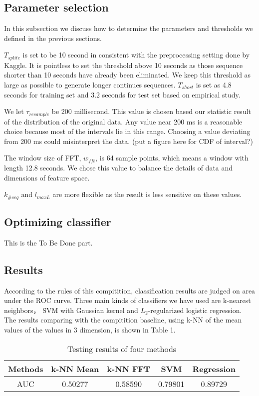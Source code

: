 \documentclass{article} %
\begin{document}
\subsection{Parameter selection}
In this subsection we discuss how to determine the parameters and thresholds we defined in the previous sections.

$T_{splite}$ is set to be 10 second in consistent with the preprocessing setting done by Kaggle. It is pointless to set the threshold above 10 seconds as those sequence shorter than 10 seconds have already been eliminated. We keep this threshold as large as possible to generate longer continues sequences. $T_{short}$ is set as 4.8 seconds for training set and 3.2 seconds for test set based on empirical study. 

We let $\tau_{resample}$ be 200 millisecond. This value is chosen based our statistic result of the distribution of the original data. Any value near 200 ms is a reasonable choice because most of the intervals lie in this range. Choosing a value deviating from 200 ms could misinterpret the data. (put a figure here for CDF of interval?)

The window size of FFT, $w_{fft}$, is 64 sample points, which means a window with length 12.8 seconds. We chose this value to balance the details of data and dimensions of feature space. 

$k_{\#seq}$ and  $l_{maxL}$ are more flexible as the result is less sensitive on these values.

\subsection{Optimizing classifier}
This is the To Be Done part.

\subsection{Results}

According to the rules of this compitition, classification results are judged on area under the ROC curve. Three main kinds of classifiers we have used are k-nearest neighbors， SVM with Gaussian kernel and $L_2$-regularized logistic regression. The results comparing with the compitition baseline, using k-NN of the mean values of the values in 3 dimension, is shown in Table 1.

\begin{table}[!ht]
\caption{Testing results of four methods}
	\begin{center}
		\begin{tabular}{ c | c  c  c  c }
			\hline
			 Methods & k-NN Mean & k-NN FFT & SVM & Regression \\
			 \hline
			 AUC & 0.50277 & 0.58590 & 0.79801 & 0.89729 \\
			 \hline
		\end{tabular}
	\end{center}
\end{table}
\end{document}
